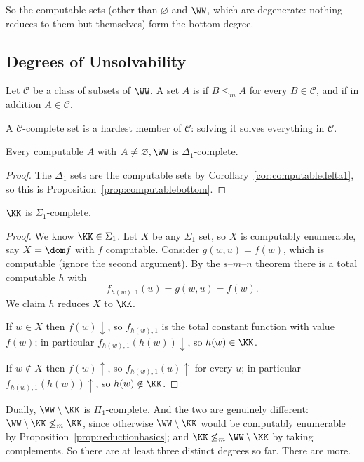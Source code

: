 So the computable sets (other than $\varnothing$ and $\WW$, which are degenerate: nothing reduces to them but themselves) form the bottom degree.

\subsection{Degrees of Unsolvability}

\begin{definition}
	Let $\mathcal C$ be a class of subsets of $\WW$. A set $A$ is  if $B \leq_m A$ for every $B \in \mathcal C$, and  if in addition $A \in \mathcal C$.
\end{definition}

A $\mathcal C$-complete set is a hardest member of $\mathcal C$: solving it solves everything in $\mathcal C$.

\begin{corollary}
	Every computable $A$ with $A \neq \varnothing, \WW$ is $\Delta_1$-complete.
\end{corollary}

\begin{proof}
	The $\Delta_1$ sets are the computable sets by Corollary~\ref{cor:computabledelta1}, so this is Proposition~\ref{prop:computablebottom}.
\end{proof}

\begin{theorem}\label{thm:ksigmacomplete}
	$\KK$ is $\Sigma_1$-complete.
\end{theorem}

\begin{proof}
	We know $\KK \in \Sigma_1$. Let $X$ be any $\Sigma_1$ set, so $X$ is computably enumerable, say $X = \dom f$ with $f$ computable. Consider $g(w,u) = f(w)$, which is computable (ignore the second argument). By the $s$--$m$--$n$ theorem there is a total computable $h$ with
	$$f_{h(w),1}(u) = g(w,u) = f(w).$$
	We claim $h$ reduces $X$ to $\KK$.

	If $w \in X$ then $f(w)\!\downarrow$, so $f_{h(w),1}$ is the total constant function with value $f(w)$; in particular $f_{h(w),1}(h(w))\!\downarrow$, so $h(w)\in\KK$.

	If $w \notin X$ then $f(w)\!\uparrow$, so $f_{h(w),1}(u)\!\uparrow$ for every $u$; in particular $f_{h(w),1}(h(w))\!\uparrow$, so $h(w)\notin\KK$.
\end{proof}

Dually, $\WW\setminus\KK$ is $\Pi_1$-complete. And the two are genuinely different: $\WW\setminus\KK \not\leq_m \KK$, since otherwise $\WW\setminus\KK$ would be computably enumerable by Proposition~\ref{prop:reductionbasics}; and $\KK \not\leq_m \WW\setminus\KK$ by taking complements. So there are at least three distinct degrees so far. There are more.

